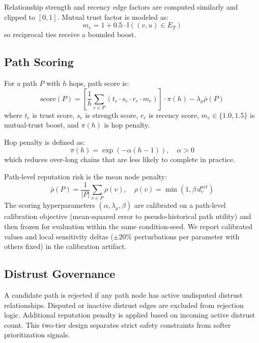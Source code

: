 \documentclass[conference]{IEEEtran}
\begin{document}
Relationship strength and recency edge factors are computed similarly and clipped to $[0,1]$. Mutual trust factor is modeled as:
\begin{equation}
m_e=1+0.5\cdot\mathbb{I}\left((v,u)\in E_T\right)
\end{equation}
so reciprocal ties receive a bounded boost.

\subsection{Path Scoring}
For a path $P$ with $h$ hops, path score is:
\begin{equation}
\text{score}(P)=\left[\frac{1}{h}\sum_{e \in P}\left( t_e \cdot s_e \cdot r_e \cdot m_e \right)\right] \cdot \pi(h)-\lambda_{\rho}\bar{\rho}(P)
\end{equation}
where $t_e$ is trust score, $s_e$ is strength score, $r_e$ is recency score, $m_e \in \{1.0, 1.5\}$ is mutual-trust boost, and $\pi(h)$ is hop penalty.

Hop penalty is defined as:
\begin{equation}
\pi(h)=\exp\left(-\alpha(h-1)\right),\quad \alpha>0
\end{equation}
which reduces over-long chains that are less likely to complete in practice.

Path-level reputation risk is the mean node penalty:
\begin{equation}
\bar{\rho}(P)=\frac{1}{|P|}\sum_{v\in P}\rho(v),\quad \rho(v)=\min(1,\beta\,d_v^{act})
\end{equation}
The scoring hyperparameters $(\alpha,\lambda_{\rho},\beta)$ are calibrated on a path-level calibration objective (mean-squared error to pseudo-historical path utility) and then frozen for evaluation within the same condition-seed. We report calibrated values and local sensitivity deltas (\(\pm 20\%\) perturbations per parameter with others fixed) in the calibration artifact.

\subsection{Distrust Governance}
A candidate path is rejected if any path node has active undisputed distrust relationships. Disputed or inactive distrust edges are excluded from rejection logic. Additional reputation penalty is applied based on incoming active distrust count. This two-tier design separates strict safety constraints from softer prioritization signals.
\end{document}
